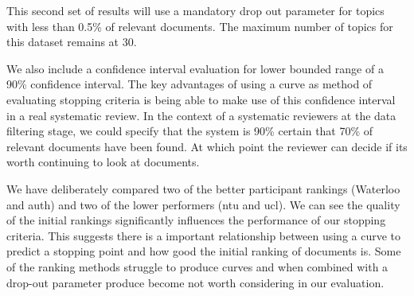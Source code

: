 This second set of results will use a mandatory drop out parameter for topics with less than 0.5\% of relevant documents.  The maximum number of topics for this dataset remains at 30.

We also include a confidence interval evaluation for lower bounded range of a 90\% confidence interval. The key advantages of using a curve as  method of evaluating stopping criteria is being able to make use of this confidence interval in a real systematic review. In the context of a systematic reviewers at the data filtering stage, we could specify that the system is 90\% certain that 70\% of relevant documents have been found. At which point the reviewer can decide if its worth continuing to look at documents.

\begin{table}[H]
\caption{Comparison of different of sample method using curve fitting for different CLEF 2017 runs. Sample size = 3. Results are taken as averages over all topics for search method. with 0.5\% drop-out}

\end{table}

We have deliberately compared two of the better participant rankings (Waterloo and auth) and two of the lower performers (ntu and ucl). We can see the quality of the initial rankings significantly influences the performance of our stopping criteria. This suggests there is a important relationship between using a curve to predict a stopping point and how good the initial ranking of documents is. Some of the ranking methods struggle to produce curves and when combined with a drop-out parameter produce become not worth considering in our evaluation.

